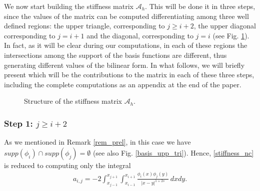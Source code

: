 We now start building the stiffness matrix $\mathcal A_h$. This will be done it in three steps, since the values of the matrix can be computed differentiating among three well defined regions: the upper triangle, corresponding to $j\geq i+2$, the upper diagonal corresponding to $j=i+1$ and the diagonal, corresponding to $j=i$ (see Fig. \ref{matrix_fig}). In fact, as it will be clear during our computations, in each of these regions the intersections among the support of the basis functions are different, thus generating different values of the bilinear form. In what follows, we will briefly present which will be the contributions to the matrix in each of these three steps, including the complete computations as an appendix at the end of the paper. 

\begin{figure}[!h]

\centering
{}
\caption{Structure of the stiffness matrix $\mathcal{A}_h$.}\label{matrix_fig}
\end{figure}

\subsubsection*{Step 1: $j\geq i+2$}
As we mentioned in Remark \ref{rem_prel}, in this case we have $supp(\phi_i)\cap supp(\phi_j) =\emptyset$ (see also Fig. \ref{basis_upp_tri}). Hence, \eqref{stiffness_nc} is reduced to computing only the integral
\begin{align}\label{elem_noint}
	a_{i,j}=-2 \int_{x_{j-1}}^{x_{j+1}}\int_{x_{i-1}}^{x_{i+1}}\frac{\phi_i(x)\phi_j(y)}{|x-y|^{1+2s}}\,dxdy.
\end{align}

